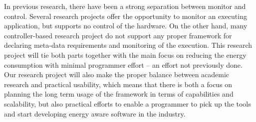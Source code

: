 \documentclass{article}
\begin{document}
In previous research, there have been a strong separation between monitor and control.
Several research projects offer the opportunity to monitor an executing application, but supports no control of the hardware.
On the other hand, many controller-based research project do not support any proper framework for declaring meta-data requirements and monitoring of the execution.
This research project will tie both parts together with the main focus on reducing the energy consumption with minimal programmer effort -- an effort not previously done.
Our research project will also make the proper balance between academic research and practical usability,
which means that there is both a focus on planning the long term usage of the framework in terms of capabilities and scalability, but also practical efforts to enable a programmer to pick up the tools and start developing energy aware software in the industry.
\end{document}
